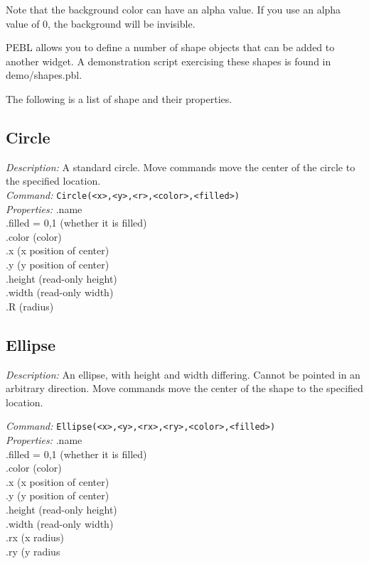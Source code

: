 Note that the background color can have an alpha value.  If you use an
alpha value of 0, the background will be invisible.


PEBL allows you to define a number of shape objects that can be added
to another widget.  A demonstration script exercising these shapes is found in demo/shapes.pbl.

The following is a list of shape and their properties.

\subsection{Circle}
\emph{Description:} A standard circle.  Move commands move the center
  of the circle to the specified location.\\

\emph{Command:}  \verb+Circle(<x>,<y>,<r>,<color>,<filled>)+\\

\emph{Properties:}
.name\\
.filled = {0,1} (whether it is filled)\\
.color (color) \\
.x  (x position of center) \\
.y  (y position of center)\\
.height (read-only height)\\
.width (read-only width)\\
.R  (radius)\\

\subsection{Ellipse}

\emph{Description:} An ellipse, with height and width differing.
  Cannot be pointed in an arbitrary direction.  Move commands move the center
  of the shape to the specified location.

\emph{Command:}  \verb+Ellipse(<x>,<y>,<rx>,<ry>,<color>,<filled>)+\\

\emph{Properties:}
.name\\
.filled = {0,1} (whether it is filled)\\
.color (color) \\
.x  (x position of center) \\
.y  (y position of center)\\
.height (read-only height)\\
.width (read-only width)\\
.rx  (x radius)\\
.ry  (y radius


